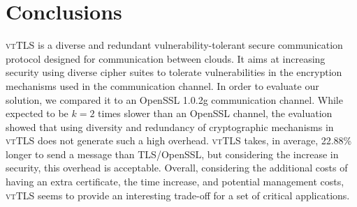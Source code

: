 \documentclass{sig-alternate-05-2015}
\newcommand{\suite}[1]{\texttt{{\footnotesize #1}}}
\begin{document}
\section{Conclusions}
\label{sec-conclusions}

\textsc{vtTLS} is a diverse and redundant vulnerability-tolerant secure communication protocol designed for communication between clouds. It aims at increasing security using  diverse cipher suites to tolerate vulnerabilities in the encryption mechanisms used in the communication channel. 
In order to evaluate our solution, we compared it to an OpenSSL 1.0.2g communication channel. While expected to be $k = 2$ times slower than an OpenSSL channel, the evaluation showed that using diversity and redundancy of cryptographic mechanisms in \textsc{vtTLS} does not generate such a high overhead. \textsc{vtTLS} takes, in average, 22.88\% longer to send a message than TLS/OpenSSL, but considering the increase in security, this overhead is acceptable.
Overall, considering the additional costs of having an extra certificate, the time increase, and potential management costs,  \textsc{vtTLS} seems to provide an interesting trade-off for a set of critical applications.


\end{document}
